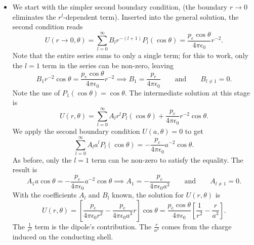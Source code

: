 \documentclass[11pt, a4paper]{article}
\newcommand{\eqtext}[1]{\qquad \text{#1} \qquad}
\newcommand{\ee}{\epsilon_{0}}  %
\begin{document}
\begin{itemize}
	\item We start with the simpler second boundary condition, (the boundary $ r \to 0 $ eliminates the $ r^{l} $-dependent term). Inserted into the general solution, the second condition reads
	\begin{equation*}
		U(r\to 0, \theta) = \sum_{l = 0}^{\infty} B_{l}r^{-(l+1)}P_{l}(\cos \theta) = \frac{p_{e}\cos \theta}{4\pi \ee }r^{-2}.
	\end{equation*}
	Note that the entire series sums to only a single term; for this to work, only the $ l = 1 $ term in the series can be non-zero, leaving
	\begin{equation*}
		B_{1}r^{-2}\cos \theta = \frac{p_{e}\cos \theta}{4\pi \ee }r^{-2} \implies B_{1} = \frac{p_{e}}{4\pi \ee} \eqtext{and} B_{l\neq 1} = 0.
	\end{equation*}
	Note the use of $ P_{1}(\cos \theta) = \cos \theta $. The intermediate solution at this stage is
	\begin{equation*}
		U(r, \theta) = \sum_{l = 0}^{\infty} A_{l} r^{l} P_{l}(\cos \theta) + \frac{p_{e}}{4\pi \ee}r^{-2} \cos \theta.
	\end{equation*}
	We apply the second boundary condition $ U(a, \theta) = 0 $ to get
	\begin{equation*}
		\sum_{l = 0}^{\infty} A_{l} a^{l} P_{l}(\cos \theta) = - \frac{p_{e}}{4\pi \ee}a^{-2} \cos \theta.
	\end{equation*}
	As before, only the $ l = 1 $ term can be non-zero to satisfy the equality. The result is
	\begin{equation*}
		A_{1}a\cos \theta = - \frac{p_{e}}{4\pi \ee}a^{-2} \cos \theta \implies A_{1} = -\frac{p_{e}}{4\pi \ee a^{3}} \eqtext{and} A_{l\neq 1} = 0.
	\end{equation*}
	With the coefficients $ A_{l} $ and $ B_{l} $ known, the solution for $ U(r, \theta) $ is
	\begin{equation*}
		U(r, \theta) = \left[\frac{p_{e}}{4\pi \ee r^{2}} -\frac{p_{e}}{4\pi \ee a^{3}}r\right]\cos \theta = \frac{p_{e}\cos \theta}{4\pi \ee}\left[\frac{1}{r^{2}} - \frac{r}{a^{3}}\right].
	\end{equation*}
	The $ \frac{1}{r^{2}} $ term is the dipole's contribution. The $ \frac{r}{a^{3}} $ comes from the charge induced on the conducting shell. 
	

\end{itemize}
\end{document}
